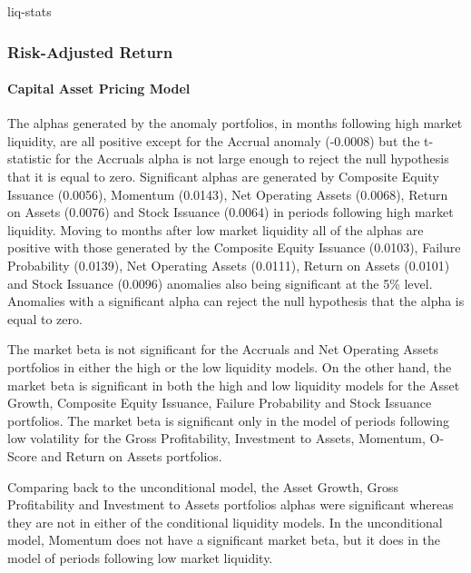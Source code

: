 \documentclass[12pt, a4paper, oneside]{article}
\begin{document}
{liq-stats}

\subsubsection{Risk-Adjusted Return}
\paragraph{Capital Asset Pricing Model}
The alphas generated by the anomaly portfolios, in months following high market liquidity, are all positive except for the Accrual anomaly (-0.0008) but the t-statistic for the Accruals alpha is not large enough to reject the null hypothesis that it is equal to zero. Significant alphas are generated by Composite Equity Issuance (0.0056), Momentum (0.0143), Net Operating Assets (0.0068), Return on Assets (0.0076) and Stock Issuance (0.0064) in periods following high market liquidity. Moving to months after low market liquidity all of the alphas are positive with those generated by the Composite Equity Issuance (0.0103), Failure Probability (0.0139), Net Operating Assets (0.0111), Return on Assets (0.0101) and Stock Issuance (0.0096) anomalies also being significant at the 5\% level. Anomalies with a significant alpha can reject the null hypothesis that the alpha is equal to zero.

The market beta is not significant for the Accruals and Net Operating Assets portfolios in either the high or the low liquidity models. On the other hand, the market beta is significant in both the high and low liquidity models for the Asset Growth, Composite Equity Issuance, Failure Probability and Stock Issuance portfolios. The market beta is significant only in the model of periods following low volatility for the Gross Profitability, Investment to Assets, Momentum, O-Score and Return on Assets portfolios.

Comparing back to the unconditional model, the Asset Growth, Gross Profitability and Investment to Assets portfolios alphas were significant whereas they are not in either of the conditional liquidity models. In the unconditional model, Momentum does not have a significant market beta, but it does in the model of periods following low market liquidity. 
\end{document}
